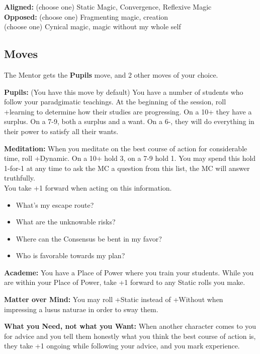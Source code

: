 \documentclass[
  oneside,
  statementpaper,
  9pt]{memoir}
\begin{document}
\textbf{Aligned:} (choose one) Static Magic, Convergence, Reflexive
Magic\\
\textbf{Opposed:} (choose one) Fragmenting magic, creation\\
(choose one) Cynical magic, magic without my whole self

\hypertarget{moves-3}{%
\subsection{Moves}\label{moves-3}}

The Mentor gets the \textbf{Pupils} move, and 2 other moves of your
choice.

\textbf{Pupils:} (You have this move by default) You have a number of
students who follow your paradgimatic teachings. At the beginning of the
session, roll +learning to determine how their studies are progressing.
On a 10+ they have a surplus. On a 7-9, both a surplus and a want. On a
6-, they will do everything in their power to satisfy all their wants.

\textbf{Meditation:} When you meditate on the best course of action for
considerable time, roll +Dynamic. On a 10+ hold 3, on a 7-9 hold 1. You
may spend this hold 1-for-1 at any time to ask the MC a question from
this list, the MC will answer truthfully.\\
You take +1 forward when acting on this information.

\begin{itemize}
\tightlist
\item
  What's my escape route?
\item
  What are the unknowable risks?
\item
  Where can the Consensus be bent in my favor?
\item
  Who is favorable towards my plan?
\end{itemize}

\textbf{Academe:} You have a Place of Power where you train your
students. While you are within your Place of Power, take +1 forward to
any Static rolls you make.

\textbf{Matter over Mind:} You may roll +Static instead of +Without when
impressing a lusus naturae in order to sway them.

\textbf{What you Need, not what you Want:} When another character comes
to you for advice and you tell them honestly what you think the best
course of action is, they take +1 ongoing while following your advice,
and you mark experience.
\end{document}
